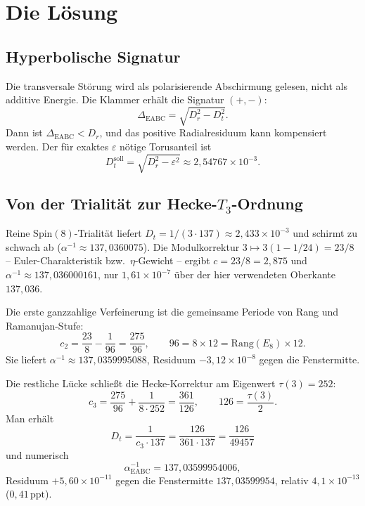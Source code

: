 \documentclass[11pt,a4paper]{article}
\begin{document}
\section{Die Lösung}

\subsection{Hyperbolische Signatur}
Die transversale Störung wird als polarisierende Abschirmung gelesen, nicht als additive Energie.
Die Klammer erhält die Signatur $(+,-)$:
\begin{equation}
\label{eq:hyp}
\Delta_{\mathrm{EABC}}=\sqrt{D_r^2-D_t^2}.
\end{equation}
Dann ist $\Delta_{\mathrm{EABC}}<D_r$, und das positive Radialresiduum kann kompensiert werden.
Der für exaktes $\varepsilon$ nötige Torusanteil ist
\begin{equation}
D_t^{\mathrm{soll}}=\sqrt{D_r^2-\varepsilon^2}\approx 2{,}54767\times 10^{-3}.
\end{equation}

\subsection{Von der Trialität zur Hecke-$T_3$-Ordnung}
Reine $\mathrm{Spin}(8)$-Trialität liefert $D_t=1/(3\cdot 137)\approx 2{,}433\times 10^{-3}$ und schirmt zu schwach ab
($\alpha^{-1}\approx 137{,}0360075$).
Die Modulkorrektur $3\mapsto 3(1-1/24)=23/8$ -- Euler-Charakteristik bzw.\ $\eta$-Gewicht -- ergibt
$c=23/8=2{,}875$ und
$\alpha^{-1}\approx 137{,}036000161$,
nur $1{,}61\times 10^{-7}$ über der hier verwendeten Oberkante $137{,}036$.

Die erste ganzzahlige Verfeinerung ist die gemeinsame Periode von Rang und Ramanujan-Stufe:
\begin{equation}
\label{eq:c2}
c_2=\frac{23}{8}-\frac{1}{96}=\frac{275}{96},\qquad 96=8\times 12=\mathrm{Rang}(E_8)\times 12.
\end{equation}
Sie liefert $\alpha^{-1}\approx 137{,}0359995088$, Residuum $-3{,}12\times 10^{-8}$ gegen die Fenstermitte.

Die restliche Lücke schließt die Hecke-Korrektur am Eigenwert $\tau(3)=252$:
\begin{equation}
\label{eq:c3}
c_3=\frac{275}{96}+\frac{1}{8\cdot 252}=\frac{361}{126},\qquad 126=\frac{\tau(3)}{2}.
\end{equation}
Man erhält
\begin{equation}
D_t=\frac{1}{c_3\cdot 137}=\frac{126}{361\cdot 137}=\frac{126}{49457}
\end{equation}
und numerisch
\begin{equation}
\label{eq:hecke}
\alpha^{-1}_{\mathrm{EABC}}=137{,}03599954006,
\end{equation}
Residuum $+5{,}60\times 10^{-11}$ gegen die Fenstermitte $137{,}03599954$, relativ $4{,}1\times 10^{-13}$ ($0{,}41\,\mathrm{ppt}$).
\end{document}
